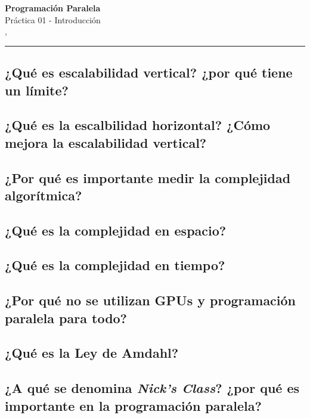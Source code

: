 



\begin{center}
    \LARGE\textbf{Programación Paralela} \\
    \Large{Práctica 01 - Introducción} \\
    \normalsize{\currentsemester, \currentyear} \\
    \vspace{1em}
    \hrule
\end{center}

\setcounter{section}{1}



\newpage

\tableofcontents

\newpage

\subsection{¿Qué es escalabilidad vertical? ¿por qué tiene un límite?}

\subsection{¿Qué es la escalbilidad horizontal? ¿Cómo mejora la escalabilidad vertical?}

\subsection{¿Por qué es importante medir la complejidad algorítmica?}

\subsection{¿Qué es la complejidad en espacio?}

\subsection{¿Qué es la complejidad en tiempo?}

\subsection{¿Por qué no se utilizan GPUs y programación paralela para todo?}

\subsection{¿Qué es la Ley de Amdahl?}

\subsection{¿A qué se denomina \textit{Nick's Class}? ¿por qué es importante en la programación paralela?}




